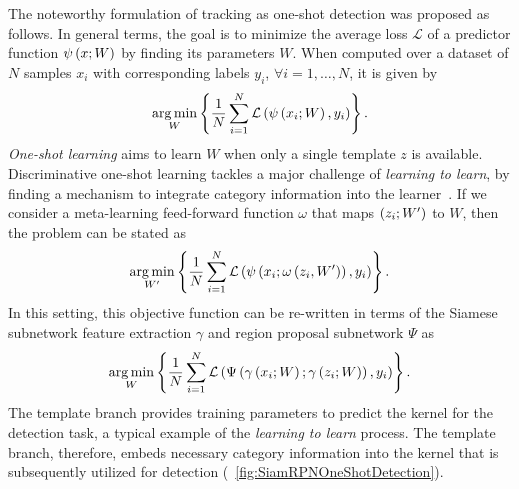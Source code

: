 The noteworthy formulation of tracking as one-shot detection was proposed as follows. In general terms, the goal is to minimize the average loss $\mathcal{L}$ of a predictor function ${\psi} \left( x; W \right)$ by finding its parameters $W$. When computed over a dataset of $N$ samples $x_i$ with corresponding labels $y_i$, $\forall i = 1, \dots, N$, it is given by
\begin{equation}
    \label{eq:SiamRPNOneShotGeneral}
    \underset{W}{\operatorname*{arg\,min}}
    \left\{ {
        \frac{1}{N}
        \sum_{i = 1}^{N}
        {\mathcal{L}} \left( 
            {\psi} \left( x_i; W \right),
            y_i
         \right)
    } \right\}.
\end{equation}
\emph{One-shot learning} aims to learn $W$ when only a single template $z$ is available.
Discriminative one-shot learning tackles a major challenge of \emph{learning to learn}, by finding a mechanism to integrate category information into the learner~\cite{bertinetto2016oneshot}. If we consider a meta-learning feed-forward function $\omega$ that maps $\left( {z_i; W'} \right)$ to $W$, then the problem can be stated as
\begin{equation}
    \label{eq:SiamRPNOneShotMetaLearning}
    \underset{W'}{\operatorname*{arg\,min}}
    \left\{ {
        \frac{1}{N}
        \sum_{i = 1}^{N}
        {\mathcal{L}} \left( 
            {\psi} \left( x_i; {\omega} \left( z_i, W' \right) \right),
            y_i
         \right)
    } \right\}.
\end{equation}
In this setting, this objective function can be re-written in terms of the Siamese subnetwork feature extraction $\gamma$ and region proposal subnetwork $\Psi$ as
\begin{equation}
    \label{eq:SiamRPNOneShoCombo}
    \underset{W}{\operatorname*{arg\,min}}
    \left\{ {
        \frac{1}{N}
        \sum_{i = 1}^{N}
        {\mathcal{L}} \left( 
            {\Psi} \left( {\gamma} \left( x_i; W \right); {\gamma} \left( z_i; W \right) \right),
            y_i
         \right)
    } \right\}.
\end{equation}
The template branch provides training parameters to predict the kernel for the detection task, a typical example of the \emph{learning to learn} process. The template branch, therefore, embeds necessary category information into the kernel that is subsequently utilized for detection (\figstr{}~\ref{fig:SiamRPNOneShotDetection}).

